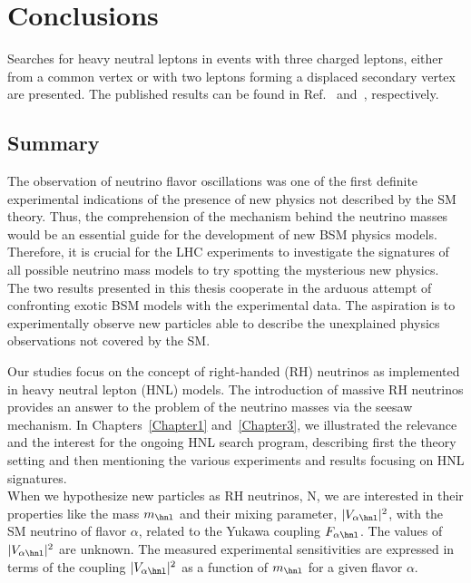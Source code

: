 
\chapter{Conclusions}\label{Chapter7} 

Searches for heavy neutral leptons in events with three charged
leptons, either from a common vertex or with two leptons forming a
displaced secondary vertex are presented. The published
results can be found in Ref.~\cite{Sirunyan:2018mtv} and~\cite{CMS-PAS-EXO-20-009}, respectively.\\

\section{Summary}
The observation of neutrino flavor oscillations was one of the first 
definite experimental indications of the
presence of new physics not described by the SM theory. 
Thus, the comprehension of the mechanism behind the neutrino masses would be an essential guide for the development of new BSM physics models. Therefore, it is crucial for the LHC experiments to investigate the signatures of all possible neutrino mass models to try spotting the mysterious new physics.\\
The two results presented in this thesis cooperate in the arduous attempt of confronting exotic BSM
models with the experimental data. The aspiration is to experimentally
observe new particles able to describe the unexplained
physics observations not covered by the SM. 

Our studies focus on the concept of right-handed (RH) neutrinos as
implemented in heavy neutral lepton (HNL) models. The introduction of massive RH
neutrinos provides an answer to the problem of the
neutrino masses via the seesaw mechanism.  
In Chapters~\ref{Chapter1} and~\ref{Chapter3}, we illustrated
the relevance and the interest for the
ongoing HNL search program, describing first the theory setting 
and then mentioning the various experiments and results
focusing on HNL signatures.\\
When we hypothesize new particles as RH neutrinos, N, we
are interested in their properties like the mass $m_\hnl$ and
their mixing parameter, $|V_{\alpha \hnl}|^2$,  with the SM neutrino of flavor $\alpha$,
related to the Yukawa coupling $F_{\alpha \hnl}$. The values of $|V_{\alpha
  \hnl}|^2$ are unknown. The measured experimental
sensitivities are expressed in
terms of the coupling $|V_{\alpha \hnl}|^2$
as a function of $m_\hnl$ for a given flavor $\alpha$. 

